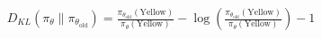 \documentclass[preview]{standalone}
\begin{document}
\begin{align*}
D_{KL}\left(\pi_\theta \parallel \pi_{\theta_{\text{old}}}\right) = \frac{\pi_{\theta_{\text{old}}}(\text{Yellow})}{\pi_\theta(\text{Yellow})} - \log\left(\frac{\pi_{\theta_{\text{old}}}(\text{Yellow})}{\pi_\theta(\text{Yellow})}\right) - 1
\end{align*}
\end{document}
